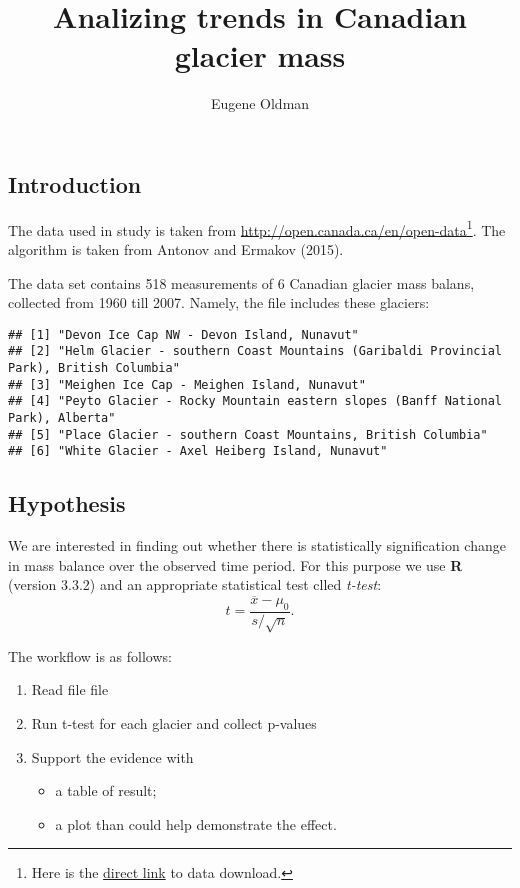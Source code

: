 \documentclass[]{article}
\title{Analizing trends in Canadian glacier mass}
\author{Eugene Oldman}
\date{}
\providecommand{\tightlist}{%
  \setlength{\itemsep}{0pt}\setlength{\parskip}{0pt}}
\let\rmarkdownfootnote\footnote%
\def\footnote{\protect\rmarkdownfootnote}
\begin{document}
\maketitle

{
\hypersetup{linkcolor=black}
\setcounter{tocdepth}{2}
\tableofcontents
}
\subsection{Introduction}\label{introduction}

The data used in study is taken from
\url{http://open.canada.ca/en/open-data}\footnote{Here is the
  \href{http://www20.statcan.gc.ca/tables-tableaux/cansim/csv/01530102-eng.zip}{direct
  link} to data download.}. The algorithm is taken from Antonov and
Ermakov (2015).

The data set contains 518 measurements of 6 Canadian glacier mass
balans, collected from 1960 till 2007. Namely, the file includes these
glaciers:

\begin{verbatim}
## [1] "Devon Ice Cap NW - Devon Island, Nunavut"                                             
## [2] "Helm Glacier - southern Coast Mountains (Garibaldi Provincial Park), British Columbia"
## [3] "Meighen Ice Cap - Meighen Island, Nunavut"                                            
## [4] "Peyto Glacier - Rocky Mountain eastern slopes (Banff National Park), Alberta"         
## [5] "Place Glacier - southern Coast Mountains, British Columbia"                           
## [6] "White Glacier - Axel Heiberg Island, Nunavut"
\end{verbatim}

\subsection{Hypothesis}\label{hypothesis}

We are interested in finding out whether there is statistically
signification change in mass balance over the observed time period. For
this purpose we use \textbf{R} (version 3.3.2) and an appropriate
statistical test clled \emph{t-test}:
\[ t = \frac{\overline{x} - \mu_0}{s/\sqrt{n}}.\]

The workflow is as follows:

\begin{enumerate}
\def\labelenumi{\arabic{enumi}.}
\tightlist
\item
  Read file file
\item
  Run t-test for each glacier and collect p-values
\item
  Support the evidence with

  \begin{itemize}
  \tightlist
  \item
    a table of result;
  \item
    a plot than could help demonstrate the effect.
  \end{itemize}
\end{enumerate}
\end{document}
